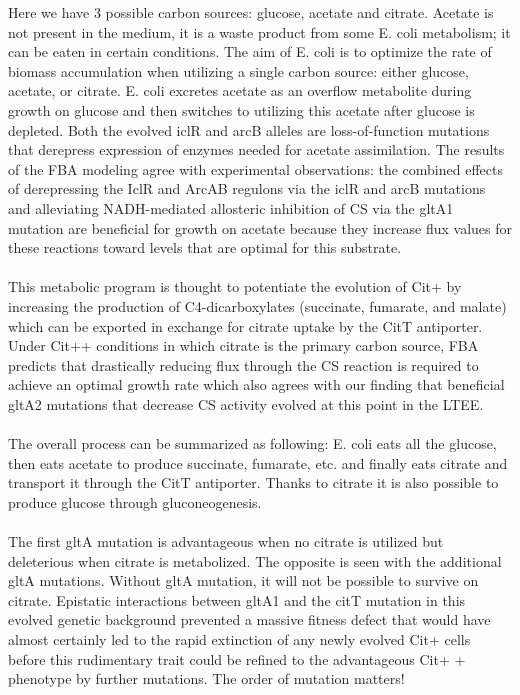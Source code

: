 \noindent
Here we have 3 possible carbon sources: glucose, acetate and citrate. Acetate is not present in the medium, it is a waste product from some E. coli metabolism; it can be eaten in certain conditions.
The aim of E. coli is to optimize the rate of biomass accumulation when utilizing a single carbon source: either glucose, acetate, or citrate. E. coli excretes acetate as an overflow metabolite during growth on glucose and then switches to utilizing this acetate after glucose is depleted. Both the evolved iclR and arcB alleles are loss-of-function mutations that derepress expression of enzymes needed for acetate assimilation. The results of the FBA modeling agree with experimental observations: the combined effects of derepressing the IclR and ArcAB regulons via the iclR and arcB mutations and alleviating NADH-mediated allosteric inhibition of CS via the gltA1 mutation are beneficial for growth on acetate because they increase flux values for these reactions toward levels that are optimal for this substrate. 
\\
\\
\noindent
This metabolic program is thought to potentiate the evolution of Cit+ by increasing the production of C4-dicarboxylates (succinate, fumarate, and malate) which can be exported in exchange for citrate uptake by the CitT antiporter. Under Cit++ conditions in which citrate is the primary carbon source, FBA predicts that drastically reducing flux through the CS reaction is required to achieve an optimal growth rate which also agrees with our finding that beneficial gltA2 mutations that decrease CS activity evolved at this point in the LTEE. 
\\
\\
\noindent
The overall process can be summarized as following: E. coli eats all the glucose, then eats acetate to produce succinate, fumarate, etc.  and finally eats citrate and transport it through the CitT antiporter. Thanks to citrate it is also possible to produce glucose through gluconeogenesis.
\\
\\
\noindent
The first gltA mutation is advantageous when no citrate is utilized but deleterious when citrate is metabolized. The opposite is seen with the additional gltA mutations. Without gltA mutation, it will not be possible to survive on citrate. Epistatic interactions between gltA1 and the citT mutation in this evolved genetic background prevented a massive fitness defect that would have almost certainly led to the rapid extinction of any newly evolved Cit+ cells before this rudimentary trait could be refined to the advantageous Cit+ + phenotype by further mutations. The order of mutation matters! 
